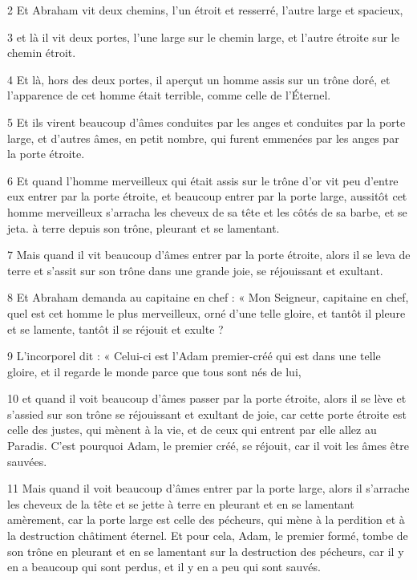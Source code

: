 \par 2 Et Abraham vit deux chemins, l'un étroit et resserré, l'autre large et spacieux,

\par 3 et là il vit deux portes, l'une large sur le chemin large, et l'autre étroite sur le chemin étroit.

\par 4 Et là, hors des deux portes, il aperçut un homme assis sur un trône doré, et l'apparence de cet homme était terrible, comme celle de l'Éternel.

\par 5 Et ils virent beaucoup d'âmes conduites par les anges et conduites par la porte large, et d'autres âmes, en petit nombre, qui furent emmenées par les anges par la porte étroite.

\par 6 Et quand l'homme merveilleux qui était assis sur le trône d'or vit peu d'entre eux entrer par la porte étroite, et beaucoup entrer par la porte large, aussitôt cet homme merveilleux s'arracha les cheveux de sa tête et les côtés de sa barbe, et se jeta. à terre depuis son trône, pleurant et se lamentant.

\par 7 Mais quand il vit beaucoup d'âmes entrer par la porte étroite, alors il se leva de terre et s'assit sur son trône dans une grande joie, se réjouissant et exultant.

\par 8 Et Abraham demanda au capitaine en chef : « Mon Seigneur, capitaine en chef, quel est cet homme le plus merveilleux, orné d'une telle gloire, et tantôt il pleure et se lamente, tantôt il se réjouit et exulte ?

\par 9 L'incorporel dit : « Celui-ci est l'Adam premier-créé qui est dans une telle gloire, et il regarde le monde parce que tous sont nés de lui,

\par 10 et quand il voit beaucoup d'âmes passer par la porte étroite, alors il se lève et s'assied sur son trône se réjouissant et exultant de joie, car cette porte étroite est celle des justes, qui mènent à la vie, et de ceux qui entrent par elle allez au Paradis. C'est pourquoi Adam, le premier créé, se réjouit, car il voit les âmes être sauvées.

\par 11 Mais quand il voit beaucoup d'âmes entrer par la porte large, alors il s'arrache les cheveux de la tête et se jette à terre en pleurant et en se lamentant amèrement, car la porte large est celle des pécheurs, qui mène à la perdition et à la destruction châtiment éternel. Et pour cela, Adam, le premier formé, tombe de son trône en pleurant et en se lamentant sur la destruction des pécheurs, car il y en a beaucoup qui sont perdus, et il y en a peu qui sont sauvés.

